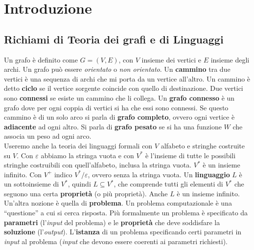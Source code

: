 \chapter{Introduzione}
\section{Richiami di Teoria dei grafi e di Linguaggi}
Un grafo è definito come $G=(V,E)$, con $V$ insieme
dei vertici e $E$ insieme degli archi. Un grafo può essere \textit{orientato} o
\textit{non orientato}. Un \textbf{cammino} tra due vertici è una sequenza di
archi che mi porta da un vertice all'altro. Un cammino è detto \textbf{ciclo} se
il vertice sorgente coincide con quello di destinazione. Due vertici sono
\textbf{connessi} se esiste un cammino che li collega. Un \textbf{grafo
  connesso} è un grafo dove per ogni coppia di vertici si ha che essi sono
connessi. Se questo cammino è di un solo arco si parla di \textbf{grafo
  completo}, ovvero ogni vertice è \textbf{adiacente} ad ogni altro. Si parla di
\textbf{grafo pesato} se si ha una funzione $W$ che associa un peso ad ogni
arco. \\
Useremo anche la teoria dei linguaggi formali con $V$ alfabeto e stringhe
costruite su $V$. Con $\varepsilon$ abbiamo la stringa vuota e con $V^*$ è
l'insieme di tutte le possibili stringhe costruibili con quell'alfabeto, inclusa
la stringa vuota. $V^*$ è un insieme infinito. Con $V^+$ indico
$V^*/\varepsilon$, ovvero senza la stringa vuota. Un \textbf{linguaggio} $L$ è
un sottoinsieme di $V^*$, quindi $L\subseteq V^*$, che comprende tutti gli
elementi di $V^*$ che seguono una certa \textbf{proprietà} (o più
proprietà). Anche $L$ è un insieme infinito.\\
Un'altra nozione è quella di \textbf{problema}. Un problema computazionale è una
``questione'' a cui si cerca risposta. Più formalmente un problema è specificato
da \textbf{parametri} (l'\textit{input} del problema) e le \textbf{proprietà} che deve
soddisfare la \textbf{soluzione} (l'\textit{output}). L'\textbf{istanza} di un problema
specificando certi parametri in \textit{input} al problema (\textit{input} che devono essere
coerenti ai parametri richiesti).\\



